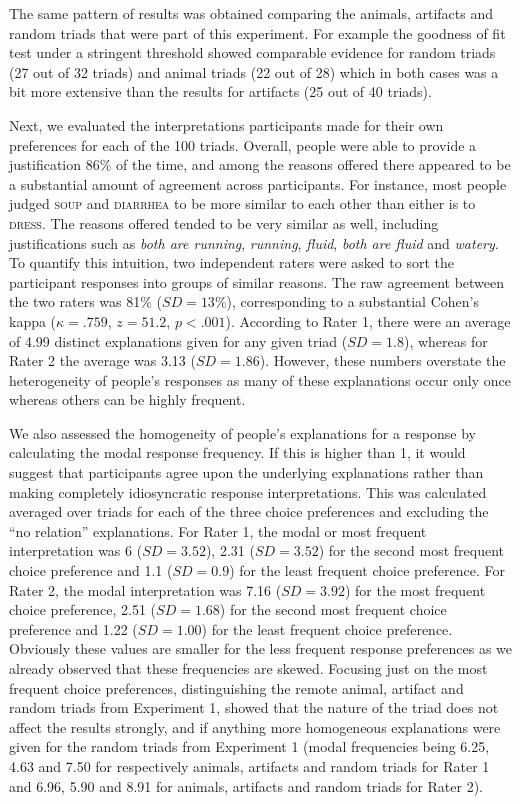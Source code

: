 \documentclass[doc]{apa6}
\newcommand{\stimulus}[1]{\textsc{#1}}
\begin{document}
The same pattern of results was obtained comparing the animals, artifacts and random triads that were part of this experiment. For example the goodness of fit test under a stringent threshold showed comparable evidence for random triads (27 out of 32 triads) and animal triads (22 out of 28) which in both cases was a bit more extensive than the results for artifacts (25 out of 40 triads).

Next, we evaluated the interpretations participants made for their own preferences for each of the 100 triads.
Overall, people were able to provide a justification 86\% of the time, and among the reasons offered there appeared to be a substantial amount of agreement across participants. For instance, most people judged \stimulus{soup} and \stimulus{diarrhea} to be more similar to each other than either is to \stimulus{dress}. The reasons offered tended to be very similar as well, including justifications such as \textit{both are running}, \textit{running}, \textit{fluid}, \textit{both are fluid} and \textit{watery}. To quantify this intuition, two independent raters were asked to sort the participant responses into groups of similar reasons. The raw agreement between the two raters was 81\% ($SD = 13\%$), corresponding to a substantial Cohen's kappa ($\kappa  = .759$, $z = 51.2$, $p < .001$).
According to Rater 1, there were an average of 4.99 distinct explanations given for any given triad ($SD=1.8$), whereas for Rater 2 the average was 3.13 ($SD=1.86$). However, these numbers overstate the heterogeneity of people's responses as many of these explanations occur only once whereas others can be highly frequent.


We also assessed the homogeneity of people's explanations for a response by calculating the modal response frequency. If this is higher than 1, it would suggest that participants agree upon the underlying explanations  rather than making completely idiosyncratic response interpretations. This was calculated averaged over triads for each of the three choice preferences and excluding the ``no relation'' explanations. For Rater 1, the modal or most frequent interpretation was 6  ($SD = 3.52$), 2.31 ($SD = 3.52$) for the second most frequent choice preference and 1.1  ($SD = 0.9$) for the least frequent choice preference.
For Rater 2, the modal interpretation was 7.16 ($SD = 3.92$) for the most frequent choice preference, 2.51 ($SD = 1.68$) for the second most frequent choice preference and 1.22 ($SD = 1.00$) for the least frequent choice preference. Obviously these values are smaller for the less frequent response preferences as we already observed that these frequencies are skewed.
Focusing just on the most frequent choice preferences, distinguishing the remote animal, artifact and random triads from Experiment 1, showed that the nature of the triad does not affect the results strongly, and if anything more homogeneous explanations were given for the random triads from Experiment 1 (modal frequencies being 6.25, 4.63 and 7.50 for respectively animals, artifacts and random triads for Rater 1 and 6.96, 5.90 and 8.91 for animals, artifacts and random triads for Rater 2).
\end{document}
